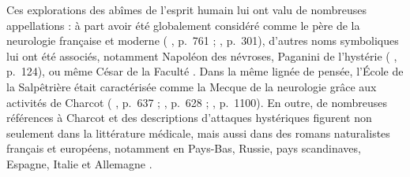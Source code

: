 Ces explorations des abîmes de l'esprit humain lui ont valu de nombreuses appellations : à part avoir été globalement considéré comme le père de la neurologie française et moderne (\citeauthor{teive2022thomas} \citeyear{teive2022thomas}, p.~761 ; \citeauthor{broussolle2012} \citeyear{broussolle2012}, p.~301), d'autres noms symboliques lui ont été associés, notamment \og{}Napoléon des névroses\fg{}, \og{}Paganini de l'hystérie\fg{} 
(\citeauthor{mirbeau1995chroniques} \citeyear{mirbeau1995chroniques}, p.~124), ou même \og{}César de la Faculté\fg{} \citep[p.~1109]{camargo2024}. Dans la même lignée de pensée, l'École de la Salpêtrière était caractérisée comme la \og{}Mecque de la neurologie\fg{} grâce aux activités de Charcot (\citeauthor{teive2014126} \citeyear{teive2014126}, p.~637 ; \citeauthor{GOETZ2017628} \citeyear{GOETZ2017628}, p.~628 ; \citeauthor{camargo2024} \citeyear{camargo2024}, p.~1100). En outre, de nombreuses références à Charcot et des descriptions d'attaques hystériques figurent non seulement dans la littérature médicale, mais aussi dans des romans naturalistes français et européens, notamment en Pays-Bas, Russie, pays scandinaves, Espagne, Italie et Allemagne \citep{KOEHLER201393}. 

